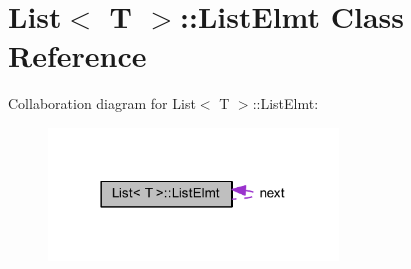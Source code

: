 \hypertarget{class_list_1_1_list_elmt}{}\section{List$<$ T $>$\+:\+:List\+Elmt Class Reference}
\label{class_list_1_1_list_elmt}


Collaboration diagram for List$<$ T $>$\+:\+:List\+Elmt\+:\nopagebreak
\begin{figure}[H]
\begin{center}
\leavevmode
\includegraphics[width=218pt]{class_list_1_1_list_elmt__coll__graph}
\end{center}
\end{figure}
